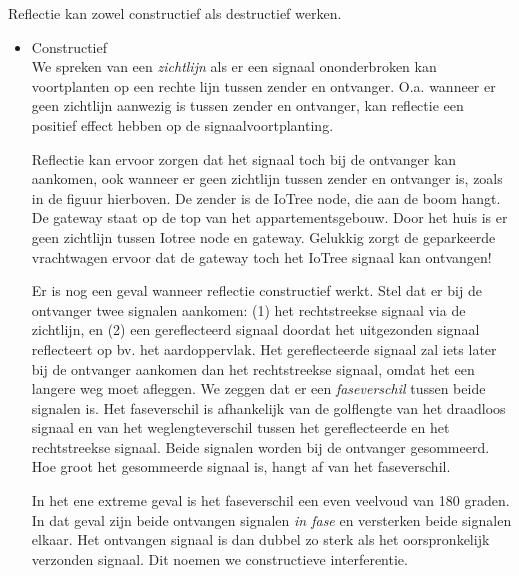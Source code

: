 Reflectie kan zowel constructief als destructief werken.
\begin{itemize}
    \item Constructief \\
    
    We spreken van een \emph{zichtlijn} als er een signaal ononderbroken kan voortplanten op een rechte lijn tussen zender en ontvanger.
    O.a. wanneer er geen zichtlijn aanwezig is tussen zender en ontvanger, kan reflectie een positief effect hebben op de signaalvoortplanting. 
    
    
    Reflectie kan ervoor zorgen dat het signaal toch bij de ontvanger kan aankomen, ook wanneer er geen zichtlijn tussen zender en ontvanger is, zoals in de figuur hierboven. De zender is de IoTree node, die aan de boom hangt. De gateway staat op de top van het appartementsgebouw. Door het huis is er geen zichtlijn tussen Iotree node en gateway. Gelukkig zorgt de geparkeerde vrachtwagen ervoor dat de gateway toch het IoTree signaal kan ontvangen!
    
    Er is nog een geval wanneer reflectie constructief werkt. Stel dat er bij de ontvanger twee signalen aankomen: (1) het rechtstreekse signaal via de zichtlijn, en (2) een gereflecteerd signaal doordat het uitgezonden signaal reflecteert op bv. het aardoppervlak. Het gereflecteerde signaal zal iets later bij de ontvanger aankomen dan het rechtstreekse signaal, omdat het een langere weg moet afleggen. We zeggen dat er een \emph{faseverschil} tussen beide signalen is. Het faseverschil is afhankelijk van de golflengte van het draadloos signaal en van het weglengteverschil tussen het gereflecteerde en het rechtstreekse signaal. Beide signalen worden bij de ontvanger gesommeerd. Hoe groot het gesommeerde signaal is, hangt af van het faseverschil.
    
    
    In het ene extreme geval is het faseverschil een even veelvoud van 180 graden. In dat geval zijn beide ontvangen signalen \emph{in fase} en versterken beide signalen elkaar. Het ontvangen signaal is dan dubbel zo sterk als het oorspronkelijk verzonden signaal. Dit noemen we constructieve interferentie.
    

\end{itemize}
